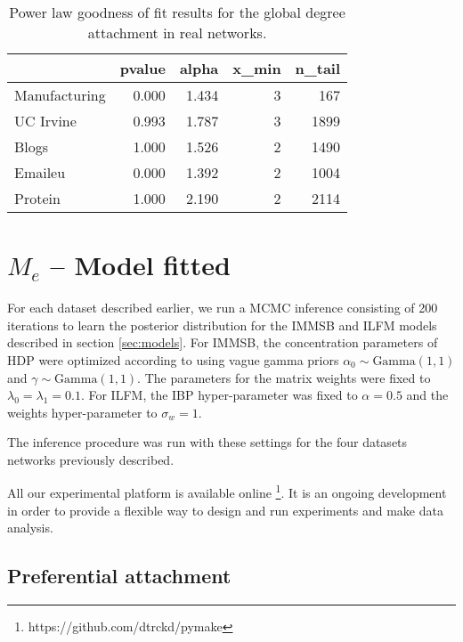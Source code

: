 \documentclass[a4paper, 12pt]{article}
\begin{document}


\begin{table}
\caption{Power law goodness of fit results for the global degree attachment in real networks.}
\centering
\begin{tabular}{lrrrr}
	\hline
	&   pvalue &   alpha &   x\_min &   n\_tail \\
	\hline
	Manufacturing &    0.000 &   1.434 &       3 &      167 \\
	UC Irvine     &    0.993 &   1.787 &       3 &     1899 \\
	Blogs         &    1.000 &   1.526 &       2 &     1490 \\
	Emaileu       &    0.000 &   1.392 &       2 &     1004 \\
	Protein       &    1.000 &   2.190 &       2 &     2114 \\
	\hline
\end{tabular}

\label{table:real_graph}
\end{table}



\section{$M_e$ -- Model fitted}

For each dataset described earlier, we run a MCMC inference consisting of 200 iterations to learn the posterior distribution for the IMMSB and ILFM  models described in section \ref{sec:models}. For IMMSB, the concentration parameters of HDP were optimized according to  \cite{HDP} using vague gamma priors $\alpha_0 \sim \text{Gamma}(1,1)$ and $\gamma \sim \text{Gamma}(1,1)$. The parameters for the matrix weights were fixed to $\lambda_0=\lambda_1=0.1$. For ILFM, the IBP hyper-parameter was fixed to $\alpha=0.5$ and the weights hyper-parameter to $\sigma_w = 1$. 

The inference procedure was run with these settings for the four datasets networks previously described.

All our experimental platform is available online \footnote{https://github.com/dtrckd/pymake}. It is an ongoing development in order to provide a flexible way to design and run experiments and make data analysis.

\subsection{Preferential attachment}
\end{document}
